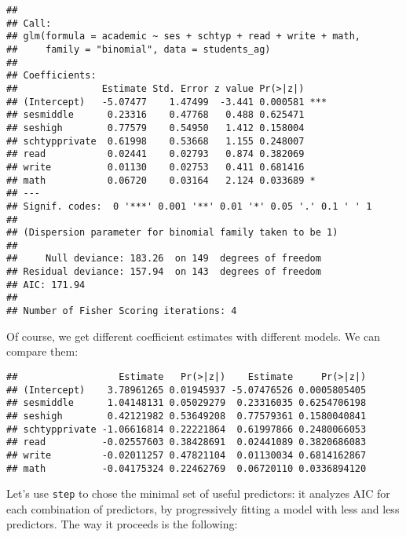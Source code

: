 \documentclass[
  oneside]{book}
\newenvironment{Shaded}{\begin{snugshade}}{\end{snugshade}}
\newcommand{\DecValTok}[1]{\textcolor[rgb]{0.00,0.00,0.81}{#1}}
\newcommand{\FunctionTok}[1]{\textcolor[rgb]{0.00,0.00,0.00}{#1}}
\newcommand{\NormalTok}[1]{#1}
\newcommand{\SpecialCharTok}[1]{\textcolor[rgb]{0.00,0.00,0.00}{#1}}
\begin{document}
\begin{verbatim}
## 
## Call:
## glm(formula = academic ~ ses + schtyp + read + write + math, 
##     family = "binomial", data = students_ag)
## 
## Coefficients:
##               Estimate Std. Error z value Pr(>|z|)    
## (Intercept)   -5.07477    1.47499  -3.441 0.000581 ***
## sesmiddle      0.23316    0.47768   0.488 0.625471    
## seshigh        0.77579    0.54950   1.412 0.158004    
## schtypprivate  0.61998    0.53668   1.155 0.248007    
## read           0.02441    0.02793   0.874 0.382069    
## write          0.01130    0.02753   0.411 0.681416    
## math           0.06720    0.03164   2.124 0.033689 *  
## ---
## Signif. codes:  0 '***' 0.001 '**' 0.01 '*' 0.05 '.' 0.1 ' ' 1
## 
## (Dispersion parameter for binomial family taken to be 1)
## 
##     Null deviance: 183.26  on 149  degrees of freedom
## Residual deviance: 157.94  on 143  degrees of freedom
## AIC: 171.94
## 
## Number of Fisher Scoring iterations: 4
\end{verbatim}

Of course, we get different coefficient estimates with different models.
We can compare them:

\begin{Shaded}
\end{Shaded}

\begin{verbatim}
##                  Estimate   Pr(>|z|)    Estimate     Pr(>|z|)
## (Intercept)    3.78961265 0.01945937 -5.07476526 0.0005805405
## sesmiddle      1.04148131 0.05029279  0.23316035 0.6254706198
## seshigh        0.42121982 0.53649208  0.77579361 0.1580040841
## schtypprivate -1.06616814 0.22221864  0.61997866 0.2480066053
## read          -0.02557603 0.38428691  0.02441089 0.3820686083
## write         -0.02011257 0.47821104  0.01130034 0.6814162867
## math          -0.04175324 0.22462769  0.06720110 0.0336894120
\end{verbatim}

Let's use \texttt{step} to chose the minimal set of useful predictors:
it analyzes AIC for each combination of predictors, by progressively
fitting a model with less and less predictors. The way it proceeds is the
following:
\end{document}
